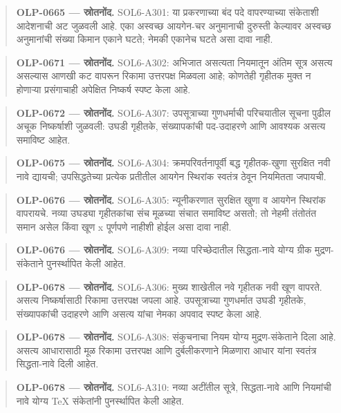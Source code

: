 \begin{quote}\small\textbf{OLP-0665 — स्रोतनोंद.} SOL6-A301: या प्रकरणाच्या बंद पदे वापरण्याच्या संकेताशी आदेशनाची अट जुळवली आहे. एका अस्वच्छ आयगेन-चर अनुमानाची दुरुस्ती केल्यावर अस्वच्छ अनुमानांची संख्या किमान एकाने घटते; नेमकी एकानेच घटते असा दावा नाही.\end{quote}
\begin{quote}\small\textbf{OLP-0671 — स्रोतनोंद.} SOL6-A302: अभिजात असत्यता नियमातून अंतिम सूत्र असत्य असल्यास आणखी कट वापरून रिकामा उत्तरपक्ष मिळवला आहे; कोणतेही गृहीतक मुक्त न होणाऱ्या प्रसंगाचाही अपेक्षित निष्कर्ष स्पष्ट केला आहे.\end{quote}
\begin{quote}\small\textbf{OLP-0672 — स्रोतनोंद.} SOL6-A307: उपसूत्राच्या गुणधर्माची परिचयातील सूचना पुढील अचूक निष्कर्षाशी जुळवली: उघडी गृहीतके, संख्यापकांची पद-उदाहरणे आणि आवश्यक असत्य समाविष्ट आहेत.\end{quote}
\begin{quote}\small\textbf{OLP-0675 — स्रोतनोंद.} SOL6-A304: क्रमपरिवर्तनापूर्वी बद्ध गृहीतक-खुणा सुरक्षित नवी नावे द्यायची; उपसिद्धतेच्या प्रत्येक प्रतीतील आयगेन स्थिरांक स्वतंत्र ठेवून नियमितता जपायची.\end{quote}
\begin{quote}\small\textbf{OLP-0676 — स्रोतनोंद.} SOL6-A305: न्यूनीकरणात सुरक्षित खुणा व आयगेन स्थिरांक वापरायचे. नव्या उघड्या गृहीतकांचा संच मूळच्या संचात समाविष्ट असतो; तो नेहमी तंतोतंत समान असेल किंवा खूण x पूर्णपणे नाहीशी होईल असा दावा नाही.\end{quote}
\begin{quote}\small\textbf{OLP-0676 — स्रोतनोंद.} SOL6-A309: नव्या परिच्छेदातील सिद्धता-नावे योग्य ग्रीक मुद्रण-संकेताने पुनर्स्थापित केली आहेत.\end{quote}
\begin{quote}\small\textbf{OLP-0678 — स्रोतनोंद.} SOL6-A306: मुख्य शाखेतील नवे गृहीतक नवी खूण वापरते. असत्य निष्कर्षासाठी रिकामा उत्तरपक्ष जपला आहे. उपसूत्राच्या गुणधर्मात उघडी गृहीतके, संख्यापकांची उदाहरणे आणि असत्य यांचा नेमका अपवाद स्पष्ट केला आहे.\end{quote}
\begin{quote}\small\textbf{OLP-0678 — स्रोतनोंद.} SOL6-A308: संकुचनाचा नियम योग्य मुद्रण-संकेताने दिला आहे. असत्य आधारासाठी मूळ रिकामा उत्तरपक्ष आणि दुर्बलीकरणाने मिळणारा आधार यांना स्वतंत्र सिद्धता-नावे दिली आहेत.\end{quote}
\begin{quote}\small\textbf{OLP-0678 — स्रोतनोंद.} SOL6-A310: नव्या अटींतील सूत्रे, सिद्धता-नावे आणि नियमांची नावे योग्य TeX संकेतांनी पुनर्स्थापित केली आहेत.\end{quote}
